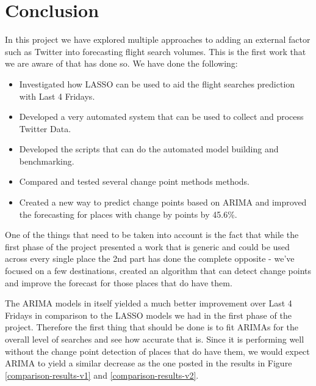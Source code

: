 \documentclass[minf,twoside,singlespacing,parskip,notimes,deptreport]{infthesis} %
\begin{document}
\section{Conclusion}


In this project we have explored multiple approaches to adding an external factor such as Twitter into forecasting flight search volumes. This is the first work that we are aware of that has done so. We have done the following:

\begin{itemize}
\item Investigated how LASSO can be used to aid the flight searches prediction with Last 4 Fridays.
\item Developed a very automated system that can be used to collect and process Twitter Data.
\item Developed the scripts that can do the automated model building and benchmarking. 
\item Compared and tested several change point methods methods.
\item Created a new way to predict change points based on ARIMA and improved the forecasting for places with change by points by 45.6\%.
\end{itemize}

One of the things that need to be taken into account is the fact that while the first phase of the project presented a work that is generic and could be used across every single place the 2nd part has done the complete opposite - we've focused on a few destinations, created an algorithm that can detect change points and improve the forecast for those places that do have them.

The ARIMA models in itself yielded a much better improvement over Last 4 Fridays in comparison to the LASSO models we had in the first phase of the project. Therefore the first thing that should be done is to fit ARIMAs for the overall level of searches and see how accurate that is. Since it is performing well without the change point detection of places that do have them, we would expect ARIMA to yield a similar decrease as the one posted in the results in Figure \ref{comparison-results-v1} and \ref{comparison-results-v2}. 




\raggedright
\sloppy


\end{document}
